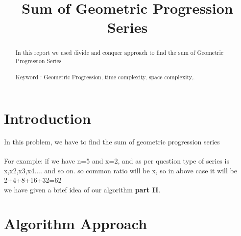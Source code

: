 \documentclass[conference]{IEEEtran}
\begin{document}
\title{
Sum of Geometric Progression Series \\
}

\author{
\and
{}
\and
{}
}

\maketitle

\noindent \begin{abstract}

In this report we used divide and conquer approach to find the sum of Geometric Progression Series\\\\
Keyword : Geometric Progression, time complexity, space complexity,.

\end{abstract}


\section{\textbf{Introduction}}
\noindent In this problem, we have to find the sum of geometric progression series \\\\

\noindent For example: if we have n=5 and x=2, and as per question type of series is x,x2,x3,x4.... and so on. so common ratio will be x, so in above case it will be 2+4+8+16+32=62\\

\noindent we have given a brief idea of our algorithm \textbf{part II}.\\


\section{\textbf {Algorithm Approach}}
\end{document}
